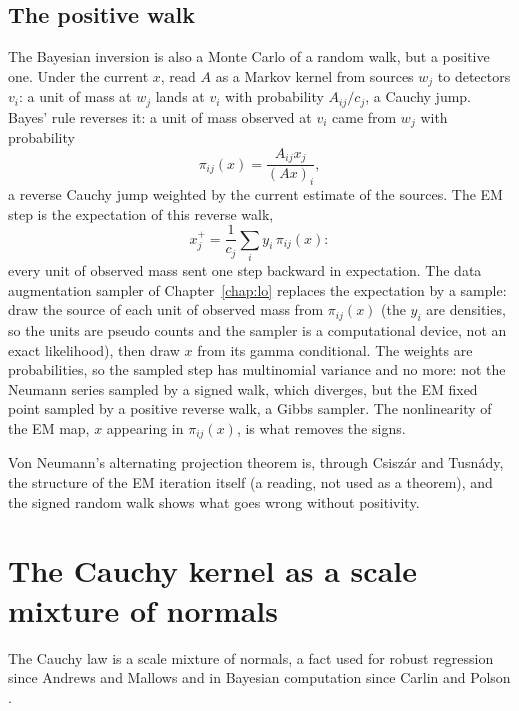 \subsection{The positive walk}

The Bayesian inversion is also a Monte Carlo of a random walk, but a positive one. Under the current $x$, read $A$ as a Markov kernel from sources $w_j$ to detectors $v_i$: a unit of mass at $w_j$ lands at $v_i$ with probability $A_{ij}/c_j$, a Cauchy jump. Bayes' rule reverses it: a unit of mass observed at $v_i$ came from $w_j$ with probability
\[
\pi_{ij}(x)=\frac{A_{ij}x_j}{(Ax)_i},
\]
a reverse Cauchy jump weighted by the current estimate of the sources. The EM step is the expectation of this reverse walk,
\[
x_j^+=\frac1{c_j}\sum_iy_i\,\pi_{ij}(x):
\]
every unit of observed mass sent one step backward in expectation. The data augmentation sampler of Chapter~\ref{chap:lo} replaces the expectation by a sample: draw the source of each unit of observed mass from $\pi_{ij}(x)$ (the $y_i$ are densities, so the units are pseudo counts and the sampler is a computational device, not an exact likelihood), then draw $x$ from its gamma conditional. The weights are probabilities, so the sampled step has multinomial variance and no more: not the Neumann series sampled by a signed walk, which diverges, but the EM fixed point sampled by a positive reverse walk, a Gibbs sampler. The nonlinearity of the EM map, $x$ appearing in $\pi_{ij}(x)$, is what removes the signs.

\begin{remark}
Von Neumann's alternating projection theorem is, through Csisz\'ar and Tusn\'ady, the structure of the EM iteration itself (a reading, not used as a theorem), and the signed random walk shows what goes wrong without positivity.
\end{remark}

\section[Cauchy as a scale mixture]{The Cauchy kernel as a scale mixture of normals}\label{cx:sec:mixture}

The Cauchy law is a scale mixture of normals, a fact used for robust regression since Andrews and Mallows \cite{AndrewsMallows74} and in Bayesian computation since Carlin and Polson \cite{CP91}.

